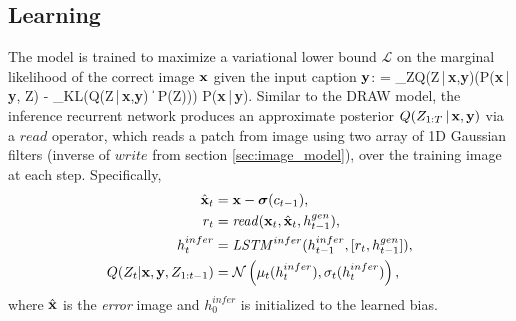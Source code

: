 \documentclass{article} %
\def\beqa#1\eeqa{\begin{eqnarray}#1\end{eqnarray}}
\newcommand{\given}{\,|\,}
\newcommand{\kldiv}{\mathrm{D}_{\rm KL}}
\newcommand{\klBars}{\,\|\,}
\newcommand{\sigmoid}{\boldsymbol{\sigma}}
\newcommand{\hdec}{h^{gen}}
\newcommand{\henc}{h^{infer}}
\newcommand{\readop}{\mathit{read}}
\newcommand{\writeop}{\mathit{write}}
\newcommand{\encoder}{\mathit{LSTM}^{infer}}
\newcommand{\canv}{c}
\newcommand{\Lat}{Z}
\newcommand{\icaption}{{\bf{y}}}
\newcommand{\oimage}{{\bf{x}}}
\newcommand{\post}{Q}
\newcommand{\prior}{P}
\newcommand{\loss}{\mathcal{L}}
\newcommand{\lloss}{\mathcal{L}^{z}}
\newcommand{\rloss}{\mathcal{L}^{x}}
\begin{document}
\subsection{Learning}
\label{sec:learning}
The model is trained to maximize a variational lower bound $\loss$ 
on the marginal likelihood of the correct image $\oimage$ given the input caption $\icaption$:
\beqa
\loss = \sum_{\Lat}Q(\Lat\given\oimage,\icaption)\bigg(\log P(\oimage\given\icaption, \Lat) - \kldiv\left(Q(\Lat\given\oimage,\icaption)\klBars 
  P(\Lat)\right)\bigg) \le \log P(\oimage\given\icaption).
\eeqa
Similar to the DRAW model, the inference recurrent network 
produces an approximate posterior $Q(\Lat_{1:T}\given\oimage,\icaption)$ via a $\readop$ operator, which reads a patch from image using two array of 1D Gaussian filters (inverse of $\writeop$ from section \ref{sec:image_model}), over the training image at each step. Specifically, 
\begin{align}
\label{eq:x_hat}
\hat{\oimage}_t &= \oimage-\sigmoid(\canv_{t-1}),\\
\label{eq:read}
r_t &= \readop(\oimage_t, \hat{\oimage}_t, \hdec_{t-1}),\\
\henc_t &= \encoder(\henc_{t-1}, [r_t, \hdec_{t-1}]),\\
\post(\Lat_t|\oimage,\icaption,\Lat_{1:t-1}) &= \mathcal{N}\left(\mu_t(\henc_t), \sigma_t(\henc_t)\right),
\end{align}
where $\hat{\oimage}$ is the \textit{error} image and $\henc_0$ is initialized to the learned bias. 
\end{document}
